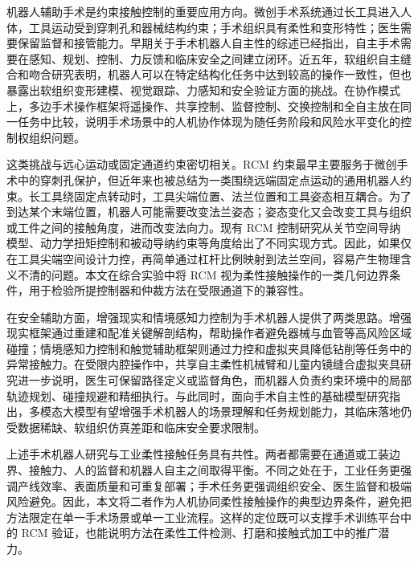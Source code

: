 机器人辅助手术是约束接触控制的重要应用方向。微创手术系统通过长工具进入人体，工具运动受到穿刺孔和器械结构约束；手术组织具有柔性和变形特性；医生需要保留监督和接管能力。早期关于手术机器人自主性的综述已经指出，自主手术需要在感知、规划、控制、力反馈和临床安全之间建立闭环\cite{yip2017autonomy,simaan2018medical}。近五年，软组织自主缝合和吻合研究表明，机器人可以在特定结构化任务中达到较高的操作一致性，但也暴露出软组织变形建模、视觉跟踪、力感知和安全验证方面的挑战\cite{saeidi2022star}。在协作模式上，多边手术操作框架将遥操作、共享控制、监督控制、交换控制和全自主放在同一任务中比较，说明手术场景中的人机协作体现为随任务阶段和风险水平变化的控制权组织问题\cite{nichols2016multilateral}。

这类挑战与远心运动或固定通道约束密切相关。RCM 约束最早主要服务于微创手术中的穿刺孔保护，但近年来也被总结为一类围绕远端固定点运动的通用机器人约束\cite{zhang2024rcmreview}。长工具绕固定点转动时，工具尖端位置、法兰位置和工具姿态相互耦合。为了到达某个末端位置，机器人可能需要改变法兰姿态；姿态变化又会改变工具与组织或工件之间的接触角度，进而改变法向力。现有 RCM 控制研究从关节空间导纳模型、动力学扭矩控制和被动导纳约束等角度给出了不同实现方式\cite{kastritsi2021rcmcontroller,minelli2021dynamicrcm,kastritsi2022passiveadmittance}。因此，如果仅在工具尖端空间设计力控，再简单通过杠杆比例映射到法兰空间，容易产生物理含义不清的问题。本文在综合实验中将 RCM 视为柔性接触操作的一类几何边界条件，用于检验所提控制器和仲裁方法在受限通道下的兼容性。


在安全辅助方面，增强现实和情境感知力控制为手术机器人提供了两类思路。增强现实框架通过重建和配准关键解剖结构，帮助操作者避免器械与血管等高风险区域碰撞\cite{chen2023markerless}；情境感知力控制和触觉辅助框架则通过力控和虚拟夹具降低钻削等任务中的异常接触力\cite{ishida2024force,ishida2024haptic}。在受限内腔操作中，共享自主柔性机械臂和儿童内镜缝合虚拟夹具研究进一步说明，医生可保留路径定义或监督角色，而机器人负责约束环境中的局部轨迹规划、碰撞规避和精细执行\cite{ma2019endoluminalshared,marinho2020virtualfixture}。与此同时，面向手术自主性的基础模型研究指出，多模态大模型有望增强手术机器人的场景理解和任务规划能力，其临床落地仍受数据稀缺、软组织仿真差距和临床安全要求限制\cite{schmidgall2024foundation,zargarzadeh2024bloodsuction}。

上述手术机器人研究与工业柔性接触任务具有共性。两者都需要在通道或工装边界、接触力、人的监督和机器人自主之间取得平衡。不同之处在于，工业任务更强调产线效率、表面质量和可重复部署；手术任务更强调组织安全、医生监督和极端风险避免。因此，本文将二者作为人机协同柔性接触操作的典型边界条件，避免把方法限定在单一手术场景或单一工业流程。这样的定位既可以支撑手术训练平台中的 RCM 验证，也能说明方法在柔性工件检测、打磨和接触式加工中的推广潜力。


